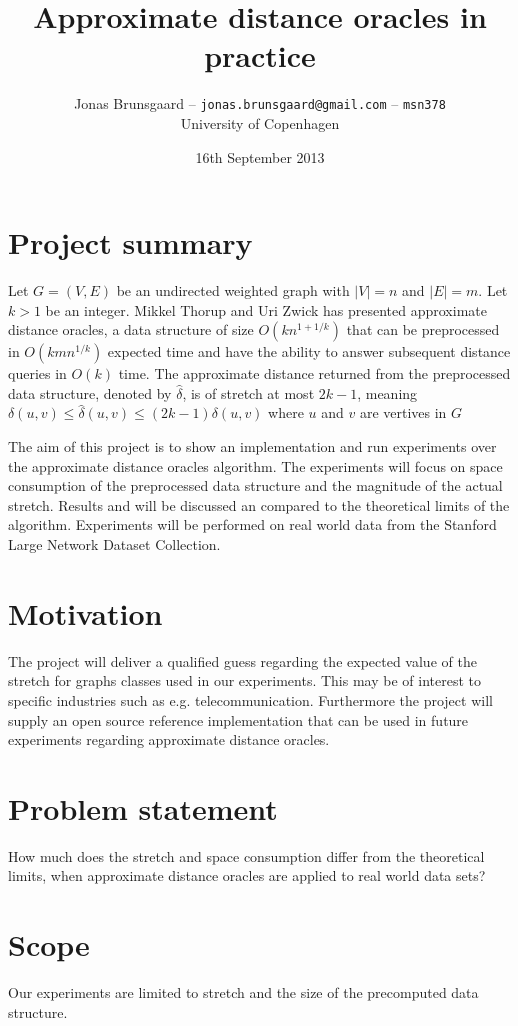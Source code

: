 \documentclass[10pt,a4paper,final,oneside,openany,article]{memoir}
\title{Approximate distance oracles in practice}
\author{
  Jonas Brunsgaard -- \texttt{jonas.brunsgaard@gmail.com} -- \texttt{msn378} \\
  University of Copenhagen
}
\date{16th September 2013}
\begin{document}
\maketitle

\chapter{Project summary}
Let $G = (V, E)$ be an undirected weighted graph with $|V| = n$ and
$|E| = m$. Let $k > 1$ be an integer. Mikkel Thorup and Uri Zwick has
presented approximate distance oracles\cite{tu}, a data structure of size
$O(kn^{1+1/k})$ that can be preprocessed in $O(kmn^{1/k})$ expected time and
have the ability to answer subsequent distance queries in $O(k)$ time. The
approximate distance returned from the preprocessed data structure, denoted
by $\hat{\delta}$, is of stretch at most $2k-1$, meaning $\delta(u,v)\leq
\hat{\delta}(u,v)\leq(2k-1)\delta(u,v)$ where $u$ and $v$ are vertives in $G$

The aim of this project is to show an implementation and run experiments over
the approximate distance oracles algorithm. The experiments will focus on
space consumption of the preprocessed data structure and the magnitude of the
actual stretch. Results and will be discussed an compared to the theoretical
limits of the algorithm. Experiments will be performed on real world data from
the Stanford Large Network Dataset Collection.

\chapter{Motivation}
The project will deliver a qualified guess regarding the expected value of the
stretch for graphs classes used in our experiments. This may be of interest to
specific industries such as e.g. telecommunication.
Furthermore the project will supply an open source reference implementation
that can be used in future experiments regarding approximate distance oracles.

\chapter{Problem statement}
How much does the stretch and space consumption differ from the theoretical
limits, when approximate distance oracles are applied to real world data sets?

\chapter{Scope}
Our experiments are limited to stretch and the size of the precomputed data
structure.
\end{document}
